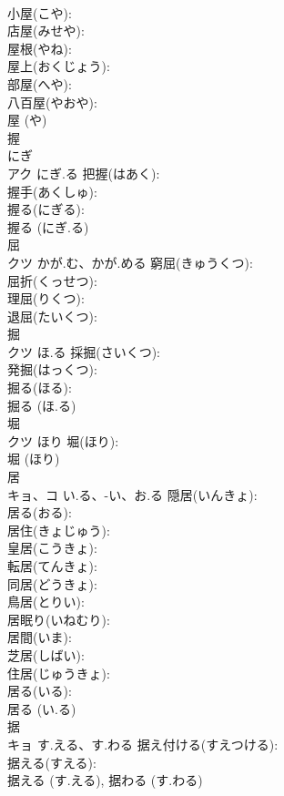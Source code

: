\documentclass[8pt]{extreport}
\begin{document}
\begin{CJK}{UTF8}{min}
\\	小屋(こや): 
\\	店屋(みせや): 
\\	屋根(やね): 
\\	屋上(おくじょう): 
\\	部屋(へや): 
\\	八百屋(やおや): 
\\	屋 (や)
\\	握			
\\	にぎ 
\\	アク	にぎ.る	把握(はあく): 
\\	握手(あくしゅ): 
\\	握る(にぎる): 
\\	握る (にぎ.る)
\\	屈			
\\	クツ	かが.む、かが.める	窮屈(きゅうくつ): 
\\	屈折(くっせつ): 
\\	理屈(りくつ): 
\\	退屈(たいくつ): 
\\	掘			
\\	クツ	ほ.る	採掘(さいくつ): 
\\	発掘(はっくつ): 
\\	掘る(ほる): 
\\	掘る (ほ.る)
\\	堀			
\\	クツ	ほり	堀(ほり): 
\\	堀 (ほり)
\\	居			
\\	キョ、コ	い.る、-い、お.る	隠居(いんきょ): 
\\	居る(おる): 
\\	居住(きょじゅう): 
\\	皇居(こうきょ): 
\\	転居(てんきょ): 
\\	同居(どうきょ): 
\\	鳥居(とりい): 
\\	居眠り(いねむり): 
\\	居間(いま): 
\\	芝居(しばい): 
\\	住居(じゅうきょ): 
\\	居る(いる): 
\\	居る (い.る)
\\	据			
\\	キョ	す.える、す.わる	据え付ける(すえつける): 
\\	据える(すえる): 
\\	据える (す.える), 据わる (す.わる)

\end{CJK}
\end{document}
